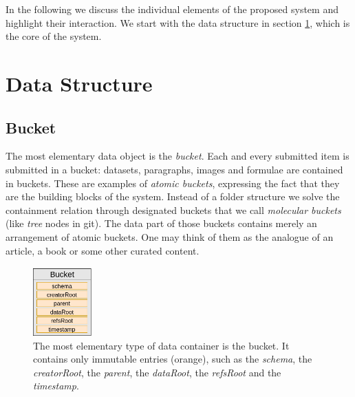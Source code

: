 \documentclass[14pt]{article}
\begin{document}
In the following we discuss the individual elements of the proposed system and highlight their interaction. We start with the data structure in section \ref{sc:datastructure}, which is the core of the system.

\section{Data Structure}
\label{sc:datastructure}
\subsection{Bucket}
\label{ssc:bucket}
The most elementary data object is the \textit{bucket}. Each and every submitted item is submitted in a bucket: datasets, paragraphs, images and formulae are contained in buckets. These are examples of \textit{atomic buckets}, expressing the fact that they are the building blocks of the system. 
Instead of a folder structure we solve the containment relation through designated buckets that we call \textit{molecular buckets} (like \textit{tree} nodes in git). The data part of those buckets contains merely an arrangement of atomic buckets. One may think of them as the analogue of an article, a book or some other curated content. 


\begin{figure}[h!]
  \begin{center}
    \includegraphics[width=0.20\textwidth]{src/img/DataBucketV2.png}
\end{center}
 \caption{The most elementary type of data container is the bucket. It contains only immutable entries (orange), such as the \textit{schema}, the \textit{creatorRoot}, the \textit{parent}, the \textit{dataRoot}, the \textit{refsRoot} and the \textit{timestamp}.}
 \label{fig:bucket}
\end{figure}
\end{document}
